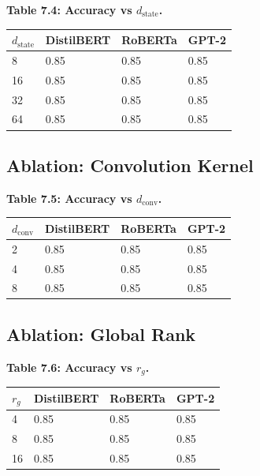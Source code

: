 \textbf{Table 7.4: Accuracy vs $d_\text{state}$.}

\begin{table}[H]
\centering
\small
\begin{tabular}{llll}
\toprule
\textbf{$d_\text{state}$} & \textbf{DistilBERT} & \textbf{RoBERTa} & \textbf{GPT-2} \\
\midrule
8 & 0.85 & 0.85 & 0.85 \\
16 & 0.85 & 0.85 & 0.85 \\
32 & 0.85 & 0.85 & 0.85 \\
64 & 0.85 & 0.85 & 0.85 \\
\bottomrule
\end{tabular}
\end{table}

\subsection{Ablation: Convolution Kernel}

\textbf{Table 7.5: Accuracy vs $d_\text{conv}$.}

\begin{table}[H]
\centering
\small
\begin{tabular}{llll}
\toprule
\textbf{$d_\text{conv}$} & \textbf{DistilBERT} & \textbf{RoBERTa} & \textbf{GPT-2} \\
\midrule
2 & 0.85 & 0.85 & 0.85 \\
4 & 0.85 & 0.85 & 0.85 \\
8 & 0.85 & 0.85 & 0.85 \\
\bottomrule
\end{tabular}
\end{table}

\subsection{Ablation: Global Rank}

\textbf{Table 7.6: Accuracy vs $r_g$.}

\begin{table}[H]
\centering
\small
\begin{tabular}{llll}
\toprule
\textbf{$r_g$} & \textbf{DistilBERT} & \textbf{RoBERTa} & \textbf{GPT-2} \\
\midrule
4 & 0.85 & 0.85 & 0.85 \\
8 & 0.85 & 0.85 & 0.85 \\
16 & 0.85 & 0.85 & 0.85 \\
\bottomrule
\end{tabular}
\end{table}

